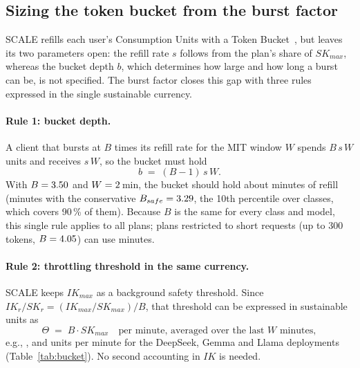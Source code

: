 \subsection{Sizing the token bucket from the burst factor}
\label{sec:bucket}

SCALE refills each user's Consumption Units with a Token Bucket~\cite{TODO-token-bucket}, but leaves its
two parameters open: the refill rate $s$ follows from the plan's share of $SK_{max}$, whereas the bucket
depth $b$, which determines how large and how long a burst can be, is not specified. The burst factor
closes this gap with three rules expressed in the single sustainable currency.

\paragraph{Rule 1: bucket depth.} A client that bursts at $B$ times its refill rate for the MIT window
$W$ spends $B\,s\,W$ units and receives $s\,W$, so the bucket must hold
\begin{equation}
  b \;=\; (B-1)\, s\, W .
  \label{eq:depth}
\end{equation}
With $B=3.50$ and $W=2$\,min, the bucket should hold about
\scaleTbDepth minutes of refill (\scaleTbDepthSafe minutes with the conservative $B_{safe}=3.29$,
the 10th percentile over classes, which covers 90\,\% of them). Because $B$ is the same for every class
and model, this single rule applies to all plans; plans restricted to short requests (up to 300 tokens,
$B=4.05$) can use \scaleTbDepthSmall minutes.

\paragraph{Rule 2: throttling threshold in the same currency.} SCALE keeps $IK_{max}$ as a background
safety threshold. Since $IK_r/SK_r=(IK_{max}/SK_{max})/B$, that threshold can be expressed in sustainable
units as
\begin{equation}
  \Theta \;=\; B \cdot SK_{max} \quad \text{per minute, averaged over the last } W \text{ minutes},
  \label{eq:throttle}
\end{equation}
e.g., \scaleTbThrottleDeepSeek, \scaleTbThrottleGemma and \scaleTbThrottleLlama units per minute for the
DeepSeek, Gemma and Llama deployments (Table~\ref{tab:bucket}). No second accounting in $IK$ is needed.

